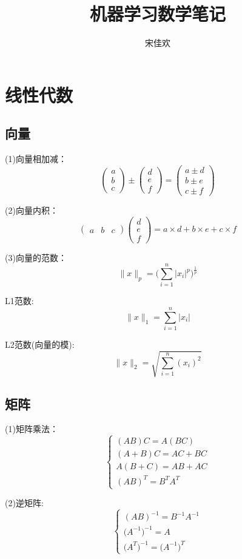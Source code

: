 \documentclass[UTF8]{ctexart} %
\title{机器学习数学笔记}
\author{宋佳欢}
\begin{document}
	\maketitle
	\tableofcontents
	\songti {}
	
	\section{线性代数}
		\subsection{向量}
		(1)向量相加减：
		\[\begin{pmatrix}a\\b\\c\end{pmatrix}  \pm \begin{pmatrix}d\\e\\f\end{pmatrix}
		=\begin{pmatrix}a\pm d\\b\pm e\\c\pm f\end{pmatrix}\]
		
		(2)向量内积：\[\begin{pmatrix}a&b&c\end{pmatrix} \begin{pmatrix}d\\e\\f\end{pmatrix}
		=a\times d+b\times e+c\times f\]
		
		(3)向量的范数：\[\|x\|_p=\Big(\sum_{i=1}^n|x_i|^p\Big)^\frac{1}{p}\]
		
		\quad \quad L1范数:  \[\|x\|_1=\sum_{i=1}^n|x_i|\]
		
		\quad \quad L2范数(向量的模):  \[\|x\|_2=\sqrt{\sum_{i=1}^n(x_i)^2}\]
		
		\subsection{矩阵}
		(1)矩阵乘法： 
		\[\begin{cases}
			(AB)C=A(BC)\\
			(A+B)C=AC+BC\\
			A(B+C)=AB+AC\\
			(AB)^T=B^TA^T
		\end{cases}\]
		
		(2)逆矩阵:
		\[\begin{cases}
		(AB)^{-1}=B^{-1}A^{-1}\\
		\big(A^{-1}\big)^{-1}=A\\
		\big(A^T\big)^{-1}=\big(A^{-1}\big)^T
		\end{cases}\]
		
\end{document}
